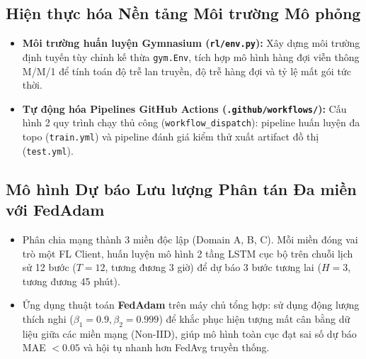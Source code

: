 \documentclass[11pt,a4paper]{article}
\begin{document}
\subsection{Hiện thực hóa Nền tảng Môi trường Mô phỏng}
\begin{itemize}
    \item \textbf{Môi trường huấn luyện Gymnasium (\texttt{rl/env.py}):} Xây dựng môi trường định tuyến tùy chỉnh kế thừa \texttt{gym.Env}, tích hợp mô hình hàng đợi viễn thông M/M/1 để tính toán độ trễ lan truyền, độ trễ hàng đợi và tỷ lệ mất gói tức thời.
    \item \textbf{Tự động hóa Pipelines GitHub Actions (\texttt{.github/workflows/}):} Cấu hình 2 quy trình chạy thủ công (\texttt{workflow\_dispatch}): pipeline huấn luyện đa topo (\texttt{train.yml}) và pipeline đánh giá kiểm thử xuất artifact đồ thị (\texttt{test.yml}).
\end{itemize}

\subsection{Mô hình Dự báo Lưu lượng Phân tán Đa miền với FedAdam}
\begin{itemize}
    \item Phân chia mạng thành 3 miền độc lập (Domain A, B, C). Mỗi miền đóng vai trò một FL Client, huấn luyện mô hình 2 tầng LSTM cục bộ trên chuỗi lịch sử 12 bước ($T=12$, tương đương 3 giờ) để dự báo 3 bước tương lai ($H=3$, tương đương 45 phút).
    \item Ứng dụng thuật toán \textbf{FedAdam} trên máy chủ tổng hợp: sử dụng động lượng thích nghi ($\beta_1=0.9, \beta_2=0.999$) để khắc phục hiện tượng mất cân bằng dữ liệu giữa các miền mạng (Non-IID), giúp mô hình toàn cục đạt sai số dự báo MAE $< 0.05$ và hội tụ nhanh hơn FedAvg truyền thống.
\end{itemize}
\end{document}
